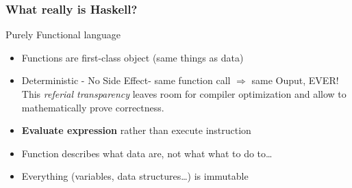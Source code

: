 	\begin{frame}[fragile]\frametitle{What really is Haskell?}
		\begin{block}{Purely Functional language}
			\begin{itemize}
			  \item Functions are first-class object (same things as data)
			\item Deterministic - No Side Effect- same function call $\Rightarrow$ same
			Ouput, EVER!\\
			This \emph{referial transparency} leaves room for compiler optimization and 
			allow to mathematically prove correctness.
			\item \textbf{Evaluate expression} rather than execute instruction
			\item Function describes what data are, not what what to do to\ldots
			\item Everything (variables, data structures\ldots) is immutable 
			\end{itemize}
			
		\end{block} 
	
	\end{frame}
	
